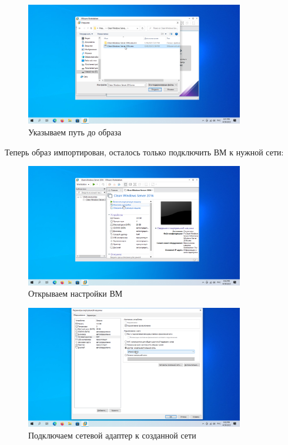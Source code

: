 \documentclass[a4paper]{article}
\begin{document}
  \begin{figure}[H]
    \centering
    \includegraphics[width=0.85\textwidth]{Screenshot_11}
    \caption{Указываем путь до образа}
    \label{img:11}
  \end{figure}

  Теперь образ импортирован, осталось только подключить ВМ к нужной сети:

  \begin{figure}[H]
    \centering
    \includegraphics[width=0.85\textwidth]{Screenshot_12}
    \caption{Открываем настройки ВМ}
    \label{img:12}
  \end{figure}

  \begin{figure}[H]
    \centering
    \includegraphics[width=0.85\textwidth]{Screenshot_13}
    \caption{Подключаем сетевой адаптер к созданной сети}
    \label{img:13}
  \end{figure}
\end{document}
